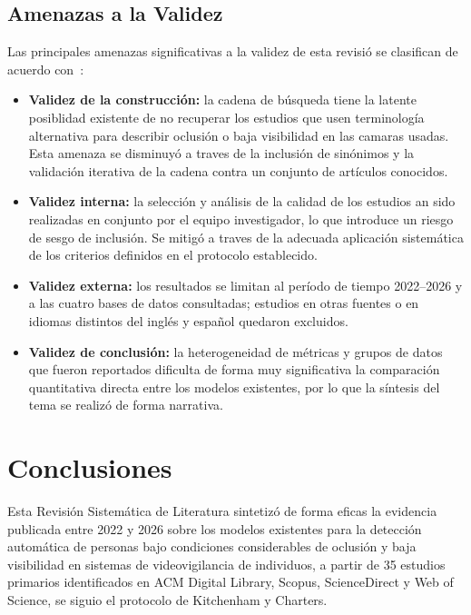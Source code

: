 \documentclass[12pt, a4paper]{article}
\begin{document}
\subsection{Amenazas a la Validez}

Las principales amenazas significativas a la validez de esta revisi\'{o}
se clasifican de acuerdo con~\cite{Wohlin2012}:

\begin{itemize}
  \item \textbf{Validez de la construcci\'{o}n:} la cadena de
        b\'{u}squeda tiene la latente posiblidad existente de no recuperar los estudios que usen terminolog\'{i}a
        alternativa para describir oclusi\'{o}n o baja visibilidad en las camaras usadas. Esta
        amenaza se disminuy\'{o} a traves de la inclusi\'{o}n de
        sin\'{o}nimos y la validaci\'{o}n iterativa de la cadena contra
        un conjunto de art\'{i}culos conocidos.
  \item \textbf{Validez interna:} la selecci\'{o}n y an\'{a}lisis de la
        calidad de los estudios an sido realizadas en conjunto por el equipo
        investigador, lo que introduce un riesgo de sesgo de
        inclusi\'{o}n. Se mitig\'{o} a traves de la adecuada aplicaci\'{o}n
        sistem\'{a}tica de los criterios definidos en el protocolo establecido.
  \item \textbf{Validez externa:} los resultados se limitan al
        per\'{i}odo de tiempo 2022--2026 y a las cuatro bases de datos
        consultadas; estudios en otras fuentes o en idiomas distintos
        del ingl\'{e}s y espa\~{n}ol quedaron excluidos.
  \item \textbf{Validez de conclusi\'{o}n:} la heterogeneidad de
        m\'{e}tricas y grupos de datos que fueron reportados dificulta de forma muy significativa la
        comparaci\'{o}n quantitativa directa entre los modelos existentes, por lo que
        la s\'{i}ntesis del tema se realiz\'{o} de forma narrativa.
\end{itemize}

\section{Conclusiones}

Esta Revisi\'{o}n Sistem\'{a}tica de Literatura sintetiz\'{o} de forma eficas la
evidencia publicada entre 2022 y 2026 sobre los modelos existentes para la
detecci\'{o}n autom\'{a}tica de personas bajo condiciones considerables
de oclusi\'{o}n y baja visibilidad en sistemas de videovigilancia de individuos, a
partir de 35 estudios primarios identificados en ACM Digital Library,
Scopus, ScienceDirect y Web of Science, se siguio el protocolo de
Kitchenham y Charters.
\end{document}
